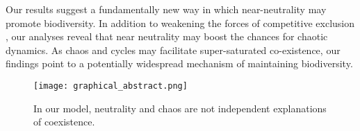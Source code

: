 Our results suggest a fundamentally new way in which near-neutrality may promote biodiversity. In addition to weakening the forces of competitive exclusion \citep{Scheffer2018}, our analyses reveal that near neutrality may boost the chances for chaotic dynamics. As chaos and cycles may facilitate super-saturated co-existence, our findings point to a potentially widespread mechanism of maintaining biodiversity.

\begin{figure}
	\begin{center}
		\texttt{[image: graphical\_abstract.png]}
	\end{center}
	\caption{In our model, neutrality and chaos are not independent explanations of coexistence.}
	\label{fig:GapInKnowledge}
\end{figure}
